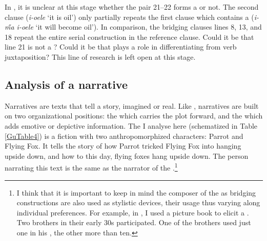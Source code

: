 \documentclass[output=paper]{LSP/langsci}
\begin{document}
In , it is unclear at this stage whether the pair 21--22 forms a  or not.  The second clause (\textit{i-oele} `it is oil') only partially repeats the first clause which contains a  (\textit{i-\H{m}a i-oele} `it will become oil'). In comparison, the bridging clauses lines 8, 13, and 18 repeat the entire serial construction in the reference clause. Could it be that line 21 is not a ? Could it be that  plays a role in differentiating  from verb juxtaposition? This line of research is left open at this stage.

\subsection{Analysis of a narrative}
\label{Gunarrative}
Narratives are texts that tell a story, imagined or real. Like , narratives are built on two organizational positions: the  which carries the plot forward, and the  which adds emotive or depictive information. The  I analyse here (schematized in Table \ref{GuTable4}) is a fiction  with two anthropomorphized characters: Parrot and Flying Fox. It tells the story of how Parrot tricked Flying Fox into hanging upside down, and how to this day, flying foxes hang upside down. The person narrating this text is the same as the narrator of the .\footnote{I think that it is important to keep in mind the composer of the  \citep[][17]{longacre83} as bridging constructions are also used as stylistic devices, their usage thus varying along individual preferences. For example, in , I used a picture book to elicit a . Two brothers in their early 30s participated. One of the brothers used just one  in his , the other more than ten.}
\end{document}
